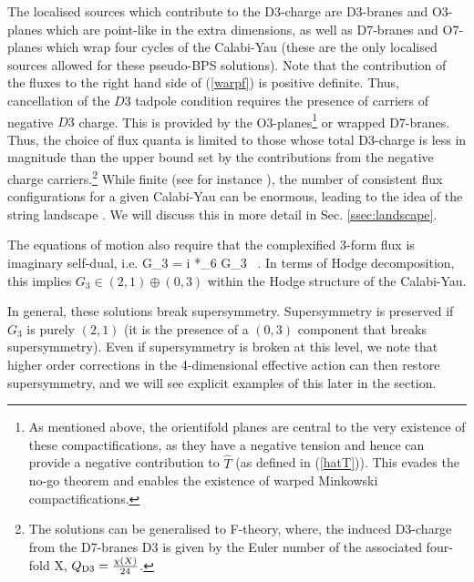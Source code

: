 The localised sources which contribute to the D3-charge are D3-branes and O3-planes which are point-like in the extra dimensions, as well as D7-branes and O7-planes which wrap four cycles of the Calabi-Yau (these are the only localised sources allowed for these pseudo-BPS solutions).   Note that the contribution of the fluxes to the right hand side of (\ref{warpf}) is positive definite. Thus, cancellation of the $D3$ tadpole condition requires the presence of carriers of negative $D3$ charge. This is provided by the O3-planes\footnote{As mentioned above, the orientifold planes are central to the very existence of these compactifications, as they have a negative tension and hence can provide a negative contribution to $\hat{T}$ (as defined in (\ref{hatT})). This evades the no-go theorem and enables the existence of warped Minkowski compactifications.} or wrapped D7-branes. Thus, the choice of flux quanta is limited to those whose total D3-charge is less in magnitude than the upper bound set by the contributions from the negative charge carriers.\footnote{The solutions can be generalised to F-theory, where, the induced D3-charge from the D7-branes D3 is given by the Euler number of the associated four-fold X, $Q_{\rm D3} = { \chi(X) \over 24}$.} While finite (see for instance \cite{Bakker:2021uqw,Grimm:2021vpn}), the number
of consistent flux configurations for a given Calabi-Yau can be enormous, leading to the idea of the string landscape
\cite{Bousso:2000xa, Feng:2000if,Susskind:2003kw, Denef:2007pq}. We will discuss this in more detail in Sec. \ref{ssec:landscape}.

The equations of motion also require that the complexified 3-form flux is imaginary self-dual, i.e.
\be
   G_{3} = i *_6 G_3 \ .
 \label{isd}
 \ee
In terms of Hodge decomposition, this implies $G_3\in(2,1)\oplus(0,3)$ within the Hodge structure of the Calabi-Yau.  
 
In general, these solutions break supersymmetry. Supersymmetry is preserved if $G_3$ is purely $(2,1)$ (it is the presence of a $(0,3)$ component that breaks supersymmetry). Even if supersymmetry is broken at this level, we note that higher order corrections in the 4-dimensional effective action can then restore supersymmetry, and we will see explicit examples of this later in the section.  
   
